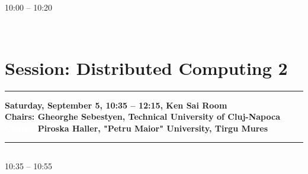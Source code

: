 \vspace*{-36pt}\subsection[ 
    	   {\bf Cloud based Privacy Preserving Efficient Document Storage and Retrieval Framework
           } \\
           {\it Gandeevan Raghuraman, Pooja Nilangekar, Pallavi Vijay, Kavya Premkumar, Saswati Mukherjee
           }
	]
	    {
            }
	    10:00 -- 10:20 \nopagebreak

            
            \\ 

\section{{\bf \large Session: %
Distributed Computing 2
}} \vspace{-15pt} %
\noindent\rule{\textwidth}{0.4pt} \nopagebreak
{\bf  
Saturday, September 5, 10:35 -- 12:15, Ken Sai Room
} \\ \nopagebreak
{\bf  Chairs: 
Gheorghe Sebestyen, Technical University of Cluj-Napoca
} \\ \nopagebreak 
{\bf  \textcolor{white}{Chairs:} 
Piroska Haller, "Petru Maior" University, Tirgu Mures
} \\ \nopagebreak 
\noindent\rule{\textwidth}{0.4pt} \nopagebreak

\vspace*{-36pt}\subsection[ 
    	   {\bf Emulation of Backhaul Packet Loss on the LTE S1-U Interface and Impact on End User Throughput
           } \\
           {\it Andrei Rusan, Radu Vasiu
           }
	]
	    {
            }
	    10:35 -- 10:55 \nopagebreak

